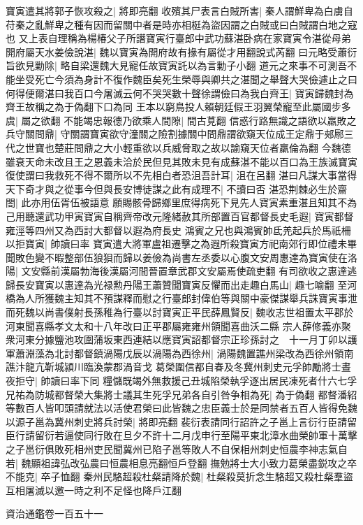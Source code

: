 寶寅遣其將郭子恢攻殺之|{
	將即亮翻}
收殯其尸表言白賊所害|{
	秦人謂鮮卑為白虜自苻秦之亂鮮卑之種有因而留關中者是時亦相梃為盜因謂之白賊或曰白賊謂白地之寇也}
又上表自理稱為楊椿父子所譖寶寅行臺郎中武功蘇湛卧病在家寶寅令湛從母弟開府屬天水姜儉說湛|{
	魏以寶寅為開府故有掾有屬從才用翻說式芮翻}
曰元略受蕭衍旨欲見勦除|{
	略自梁還魏大見寵任故寶寅託以為言勦子小翻}
道元之來事不可測吾不能坐受死亡今須為身計不復作魏臣矣死生榮辱與卿共之湛聞之舉聲大哭儉遽止之曰何得便爾湛曰我百口今屠滅云何不哭哭數十聲徐謂儉曰為我白齊王|{
	寶寅歸魏封為齊王故稱之為于偽翻下口為同}
王本以窮鳥投人賴朝廷假王羽翼榮寵至此屬國步多虞|{
	屬之欲翻}
不能竭忠報德乃欲乘人間隙|{
	間古莧翻}
信惑行路無識之語欲以羸敗之兵守關問鼎|{
	守關謂寶寅欲守潼關之險割據關中問鼎謂欲窺天位成王定鼎于郟鄏三代之世寶也楚莊問鼎之大小輕重欲以兵威脅取之故以諭窺天位者羸倫為翻}
今魏德雖衰天命未改且王之恩義未洽於民但見其敗未見有成蘇湛不能以百口為王族滅寶寅復使謂曰我救死不得不爾所以不先相白者恐沮吾計耳|{
	沮在呂翻}
湛曰凡謀大事當得天下奇才與之從事今但與長安博徒謀之此有成理不|{
	不讀曰否}
湛恐荆棘必生於齋閤|{
	此亦用伍胥伍被語意}
願賜骸骨歸鄉里庶得病死下見先人寶寅素重湛且知其不為己用聽還武功甲寅寶寅自稱齊帝改元隆緒赦其所部置百官都督長史毛遐|{
	寶寅都督雍涇等四州又為西討大都督以遐為府長史}
鴻賓之兄也與鴻賓帥氐羌起兵於馬祇柵以拒寶寅|{
	帥讀曰率}
寶寅遣大將軍盧祖遷擊之為遐所殺寶寅方祀南郊行即位禮未畢聞敗色變不暇整部伍狼狽而歸以姜儉為尚書左丞委以心腹文安周惠達為寶寅使在洛陽|{
	文安縣前漢屬勃海後漢屬河間晉置章武郡文安屬焉使疏吏翻}
有司欲收之惠達逃歸長安寶寅以惠達為光禄勲丹陽王蕭贊聞寶寅反懼而出走趣白馬山|{
	趣七喻翻}
至河橋為人所獲魏主知其不預謀釋而慰之行臺郎封偉伯等與關中豪傑謀舉兵誅寶寅事泄而死魏以尚書僕射長孫稚為行臺以討寶寅正平民薛鳳賢反|{
	魏收志世祖置太平郡於河東聞喜縣孝文太和十八年改曰正平郡屬雍雍州領聞喜曲沃二縣}
宗人薛修義亦聚衆河東分據鹽池攻圍蒲坂東西連結以應寶寅詔都督宗正珍孫討之　十一月丁卯以護軍蕭淵藻為北討都督鎮渦陽戊辰以渦陽為西徐州|{
	渦陽魏置譙州梁改為西徐州領南譙汴龍亢靳城潁川臨渙蒙郡渦音戈}
葛榮圍信都自春及冬冀州刺史元孚帥勵將士晝夜拒守|{
	帥讀曰率下同}
糧儲既竭外無救援己丑城陷榮執孚逐出居民凍死者什六七孚兄祐為防城都督榮大集將士議其生死孚兄弟各自引咎争相為死|{
	為于偽翻}
都督潘紹等數百人皆叩頭請就法以活使君榮曰此皆魏之忠臣義士於是同禁者五百人皆得免魏以源子邕為冀州刺史將兵討榮|{
	將即亮翻}
裴衍表請同行詔許之子邕上言衍行臣請留臣行請留衍若逼使同行敗在旦夕不許十二月戊申行至陽平東北漳水曲榮帥軍十萬擊之子邕衍俱敗死相州吏民聞冀州已陷子邕等敗人不自保相州刺史恒農李神志氣自若|{
	魏顯祖諱弘改弘農曰恒農相息亮翻恒戶登翻}
撫勉將士大小致力葛榮盡鋭攻之卒不能克|{
	卒子恤翻}
秦州民駱超殺杜粲請降於魏|{
	杜粲殺莫折念生駱超又殺杜粲羣盜互相屠滅以邀一時之利不足怪也降戶江翻}


資治通鑑卷一百五十一
